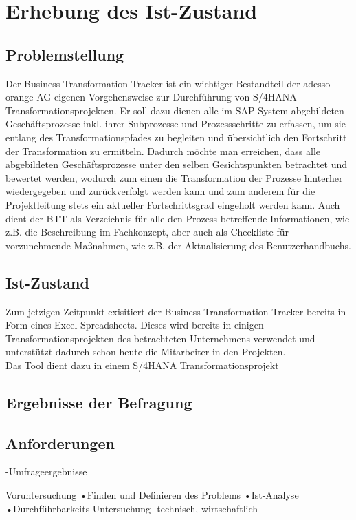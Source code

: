 \section{Erhebung des Ist-Zustand}

\subsection{Problemstellung}
Der Business-Transformation-Tracker ist ein wichtiger Bestandteil der adesso orange AG eigenen Vorgehensweise zur Durchführung von S/4HANA Transformationsprojekten. Er soll dazu dienen alle im SAP-System abgebildeten Geschäftsprozesse inkl. ihrer Subprozesse und Prozessschritte zu erfassen, um sie entlang des Transformationspfades zu begleiten und übersichtlich den Fortschritt der Transformation zu ermitteln. Dadurch möchte man erreichen, dass alle abgebildeten Geschäftsprozesse unter den selben Gesichtspunkten betrachtet und bewertet werden, wodurch zum einen die Transformation der Prozesse hinterher wiedergegeben und zurückverfolgt werden kann und zum anderem für die Projektleitung stets ein aktueller Fortschrittsgrad eingeholt werden kann. Auch dient der BTT als Verzeichnis für alle den Prozess betreffende Informationen, wie z.B. die Beschreibung im Fachkonzept, aber auch als Checkliste für vorzunehmende Maßnahmen, wie z.B. der Aktualisierung des Benutzerhandbuchs.  


\subsection{Ist-Zustand}
Zum jetzigen Zeitpunkt exisitiert der Business-Transformation-Tracker bereits in Form eines Excel-Spreadsheets. Dieses wird bereits in einigen Transformationsprojekten des betrachteten Unternehmens verwendet und unterstützt dadurch schon heute die Mitarbeiter in den Projekten. \\Das Tool dient dazu in einem S/4HANA Transformationsprojekt 

\subsection{Ergebnisse der Befragung}

\subsection{Anforderungen}
-Umfrageergebnisse

Voruntersuchung
•Finden und Definieren des Problems
•Ist-Analyse
•Durchführbarkeits-Untersuchung
-technisch, wirtschaftlich

